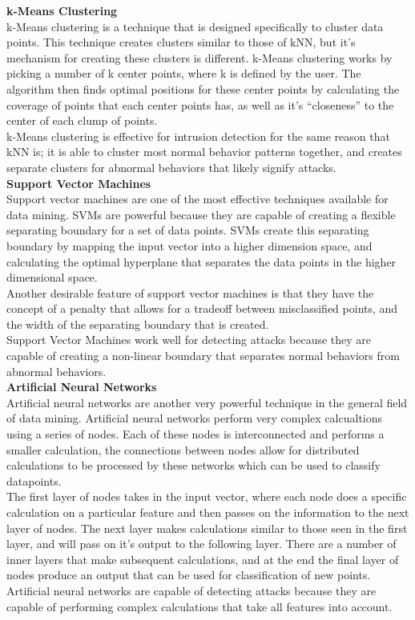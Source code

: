 \documentclass[12pt]{article} %
\begin{document}
\noindent
\textbf{k-Means Clustering}\\
k-Means clustering is a technique that is designed specifically to cluster data points. This technique creates clusters similar to those of kNN, but it's mechanism for creating these clusters is different. k-Means clustering works by picking a number of k center points, where k is defined by the user. The algorithm then finds optimal positions for these center points by calculating the coverage of points that each center points has, as well as it's ``closeness'' to the center of each clump of points.\\
k-Means clustering is effective for intrusion detection for the same reason that kNN is; it is able to cluster most normal behavior patterns together, and creates separate clusters for abnormal behaviors that likely signify attacks.\\

\noindent
\textbf{Support Vector Machines}\\
Support vector machines are one of the most effective techniques available for data mining. SVMs are powerful because they are capable of creating a flexible separating boundary for a set of data points. SVMs create this separating boundary by mapping the input vector into a higher dimension space, and calculating the optimal hyperplane that separates the data points in the higher dimensional space.\\
Another desirable feature of support vector machines is that they have the concept of a penalty that allows for a tradeoff between misclassified points, and the width of the separating boundary that is created.\\
Support Vector Machines work well for detecting attacks because they are capable of creating a non-linear boundary that separates normal behaviors from abnormal behaviors.\\


\noindent
\textbf{Artificial Neural Networks}\\
Artificial neural networks are another very powerful technique in the general field of data mining. Artificial neural networks perform very complex calcualtions using a series of nodes. Each of these nodes is interconnected and performs a smaller calculation, the connections between nodes allow for distributed calculations to be processed by these networks which can be used to classify datapoints.\\
The first layer of nodes takes in the input vector, where each node does a specific calculation on a particular feature and then passes on the information to the next layer of nodes. The next layer makes calculations similar to those seen in the first layer, and will pass on it's output to the following layer. There are a number of inner layers that make subsequent calculations, and at the end the final layer of nodes produce an output that can be used for classification of new points.\\
Artificial neural networks are capable of detecting attacks because they are capable of performing complex calculations that take all features into account.\\
\end{document}
